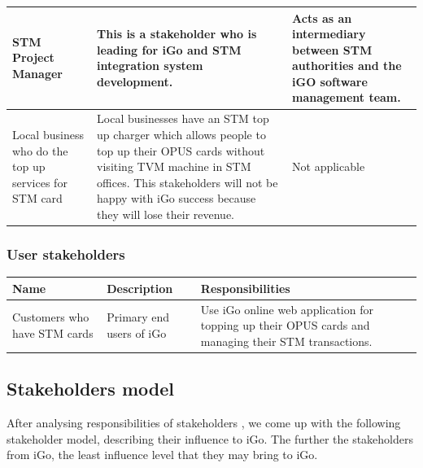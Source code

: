 \documentclass[11pt, english]{article}
\begin{document}
\setlength{\tabcolsep}{18pt}
\renewcommand{\arraystretch}{1.5}
\begin{tabular}{ |p{3cm}|p{7cm}|p{3cm}| }
\hline
STM Project Manager &
This is a stakeholder who is leading for iGo and STM integration system development. &
Acts as an intermediary between STM authorities and the iGO software management team.\\
\hline
Local business who do the top up services for STM card &
 Local businesses have an STM top up charger which allows people to top up their OPUS cards without visiting TVM machine in STM offices. This stakeholders will not be happy with iGo success because they will lose their revenue. \cite{opus_card_at_home}&


Not applicable\\
\hline

\end{tabular}

\subsubsection{User stakeholders}
\vspace*{0.1in}
\setlength{\tabcolsep}{18pt}
\renewcommand{\arraystretch}{1.5}
\begin{tabular}{ |p{3cm}|p{4cm}|p{6cm}| }
\hline
Name & Description & Responsibilities\\
\hline

Customers who have STM cards &
Primary end users of iGo &
Use iGo online web application for topping up their OPUS cards and managing their STM transactions. \\

\hline

\end{tabular}

\subsection{Stakeholders model}
After analysing responsibilities of stakeholders , we come up with the following stakeholder model, describing their influence to iGo. The further the stakeholders from iGo, the least influence level that they may bring to iGo.
\end{document}
